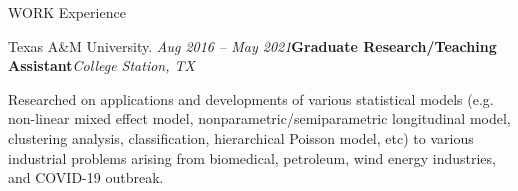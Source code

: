 \documentclass{resume} %
\begin{document}
\begin{rSection}{WORK Experience}
\begin{rSubsection}{Texas A\&M University.
}{\em Aug 2016 -- May 2021}{\textbf{Graduate Research/Teaching Assistant}}{\em College Station, TX}
\item 
Researched on applications and developments of various statistical models (e.g. non-linear mixed effect model, nonparametric/semiparametric longitudinal model, clustering analysis, classification, hierarchical Poisson model, etc) to various industrial problems arising from biomedical, petroleum, wind energy industries, and COVID-19 outbreak.
\end{rSubsection}


\end{rSection}

\end{document}
